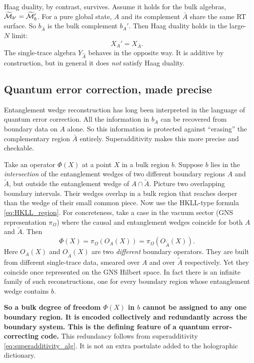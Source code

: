 Haag duality, by contrast, survives. Assume it holds for the bulk algebras, $\widetilde{\mathcal{M}}_{b'}=
\widetilde{\mathcal{M}}_b'$. For a pure global state, $A$ and its complement $\bar A$ share the same RT surface. So
$b_{\bar A}$ is the bulk complement $b_A'$. Then Haag duality holds in the large-$N$ limit:
\[
X_{A}' = X_{\bar A} .
\]
The single-trace algebra $Y_{\widehat A}$ behaves in the opposite way. It is additive by construction, but in
general it does \emph{not} satisfy Haag duality.

\subsection*{Quantum error correction, made precise}

Entanglement wedge reconstruction has long been interpreted in the language of quantum error correction.
All the information in $b_A$ can be recovered from boundary data on $A$ alone. So this information is
protected against ``erasing'' the complementary region $\bar A$ entirely. Superadditivity makes this more
precise and checkable.

Take an operator $\Phi(X)$ at a point $X$ in a bulk region $b$. Suppose $b$ lies in the \emph{intersection}
of the entanglement wedges of two different boundary regions $A$ and $\widetilde A$, but outside the
entanglement wedge of $A\cap\widetilde A$. Picture two overlapping boundary intervals. Their wedges overlap
in a bulk region that reaches deeper than the wedge of their small common piece. Now use the HKLL-type formula
\eqref{eq:HKLL_region}. For concreteness, take a case in the vacuum sector (GNS representation $\pi_\Omega$)
where the causal and entanglement wedges coincide for both $A$ and $\widetilde A$. Then
\begin{equation}
\Phi(X) = \pi_\Omega(O_A(X)) = \pi_\Omega(O_{\widetilde A}(X)) .
\label{eq:double_reconstruction}
\end{equation}
Here $O_A(X)$ and $O_{\widetilde A}(X)$ are two \emph{different} boundary operators. They are built from
different single-trace data, smeared over $A$ and over $\widetilde A$ respectively. Yet they coincide once
represented on the GNS Hilbert space. In fact there is an infinite family of such reconstructions, one for
every boundary region whose entanglement wedge contains $b$.

\textbf{So a bulk degree of freedom $\Phi(X)$ in $b$ cannot be assigned to any one boundary region. It is
encoded collectively and redundantly across the boundary system. This is the defining feature of a quantum
error-correcting code.} This redundancy follows from superadditivity \eqref{eq:superadditivity_alg}. It is not
an extra postulate added to the holographic dictionary.

